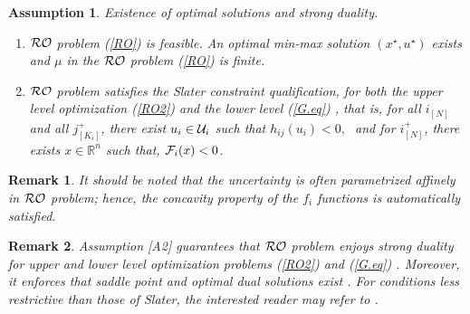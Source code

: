 \documentclass[journal,twoside,web]{ieeecolor}
\newtheorem{assumption}[theorem]{Assumption}
\newtheorem{remark}{Remark}
\begin{document}
\begin{assumption} \label{assume_feasible} Existence of optimal solutions and strong duality.

\begin{enumerate}
\item [A1] ${\cal RO}$ problem (\ref{RO}) is feasible. An optimal min-max solution $(x^\star,u^\star)$ exists and $\mu$ in the ${\cal RO}$ problem (\ref{RO}) is finite.
\item [A2] ${\cal RO}$ problem satisfies the Slater constraint qualification, for both the upper level optimization (\ref{RO2}) and the lower level (\ref{G.eq})
 \cite{bental2009-2}, that is, 
for all $i_{[N]}$ and all $j^+_{[K_i]}$, there exist $u_i \in {\cal U}_i$ such that $h_{ij}(u_i)<0,\;$  and 
for $i^+_{[N]}$,  there exists $x \in \mathbb{R}^n$ such that, ${\cal F}_i(x)<0$\;.
\end{enumerate}
\end{assumption}
\begin{remark}
    It should be noted that the uncertainty is often parametrized affinely in ${\cal RO}$ problem; hence, the concavity property of the $f_i$ functions is automatically satisfied.
\end{remark}
\begin{remark} \label{strong_duality_rem}
Assumption [A2] guarantees that ${\cal RO}$ problem enjoys strong duality for upper and lower level optimization problems (\ref{RO2}) and (\ref{G.eq}) \cite[Section~5.2.3, 5.9.1]{boyd2004}. Moreover, it enforces that saddle point and optimal dual solutions exist \cite{bental2009-2}. For conditions less restrictive than those of Slater, the interested reader may refer to \cite{jeyakumar2010}.
\end{remark}
\end{document}
